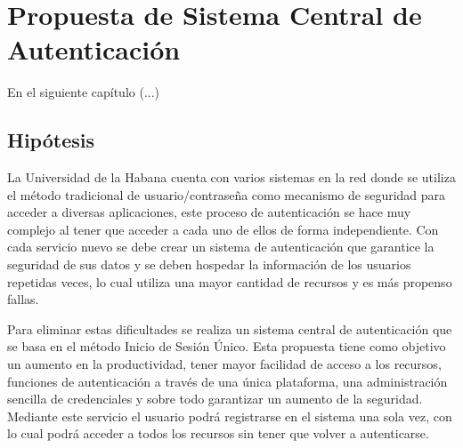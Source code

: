 \chapter{Propuesta de Sistema Central de Autenticación}\label{chapter:proposal}
En el siguiente capítulo (...)
\section*{Hipótesis}
La Universidad de la Habana cuenta con varios sistemas en la red donde se utiliza el método tradicional de usuario/contraseña como mecanismo de seguridad para acceder a diversas aplicaciones, este proceso de autenticación se hace muy complejo al tener que acceder a cada uno de ellos de forma independiente. Con cada servicio nuevo se debe crear un sistema de autenticación que garantice la seguridad de sus datos y se deben hospedar la información de los usuarios repetidas veces, lo cual utiliza una mayor cantidad de recursos y es más propenso fallas.

Para eliminar estas dificultades se realiza un sistema central de autenticación que se basa en el método Inicio de Sesión Único. Esta propuesta tiene como objetivo un aumento en la productividad, tener mayor facilidad de acceso a los recursos, funciones de autenticación a través de una única plataforma, una administración sencilla de credenciales y sobre todo garantizar un aumento de la seguridad. Mediante este servicio el usuario podrá registrarse en el sistema una sola vez, con lo cual podrá acceder a todos los recursos sin tener que volver a autenticarse.


